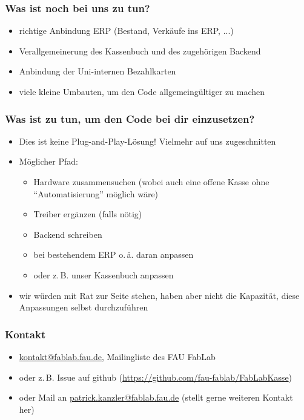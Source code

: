 \documentclass[german]{beamer} %
\begin{document}
\begin{frame}
\frametitle{Was ist noch bei uns zu tun?}
 \begin{itemize}
   \item richtige Anbindung ERP (Bestand, Verkäufe ins ERP, ...)
   \item Verallgemeinerung des Kassenbuch und des zugehörigen Backend
   \item Anbindung der Uni-internen Bezahlkarten
   \item viele kleine Umbauten, um den Code allgemeingültiger zu machen
 \end{itemize} 
\end{frame}

\begin{frame}
\frametitle{Was ist zu tun, um den Code bei dir einzusetzen?}
  \begin{itemize}
    \item Dies ist keine Plug-and-Play-Lösung! Vielmehr auf uns zugeschnitten
    \item Möglicher Pfad:
      \begin{itemize}
         \item Hardware zusammensuchen (wobei auch eine offene Kasse ohne \enquote{Automatisierung} möglich wäre)
         \item Treiber ergänzen (falls nötig)
         \item Backend schreiben
         \item bei bestehendem ERP o.\,ä. daran anpassen
         \item oder z.\,B. unser Kassenbuch anpassen
      \end{itemize}
    \item wir würden mit Rat zur Seite stehen, haben aber nicht die Kapazität, diese Anpassungen selbst durchzuführen
  \end{itemize}
\end{frame}

\begin{frame}
\frametitle{Kontakt}
 \begin{itemize}
  \item \url{kontakt@fablab.fau.de}, Mailingliste des FAU FabLab
  \item oder z.\,B. Issue auf github (\url{https://github.com/fau-fablab/FabLabKasse})
  \item oder Mail an \url{patrick.kanzler@fablab.fau.de} (stellt gerne weiteren Kontakt her)
 \end{itemize}
\end{frame}
\end{document}
